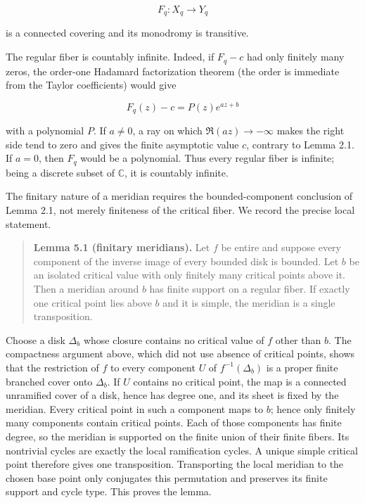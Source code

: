 \documentclass[11pt]{article}
\theoremstyle{keio}
\theoremstyle{definition}
\theoremstyle{remark}
\begin{document}
\[
 F_q:X_q\longrightarrow Y_q
\]

is a connected covering and its monodromy is transitive.

The regular fiber is countably infinite. Indeed, if \(F_q-c\) had only
finitely many zeros, the order-one Hadamard factorization theorem (the order
is immediate from the Taylor coefficients) would give

\[
 F_q(z)-c=P(z)e^{az+b}
\]

with a polynomial \(P\). If \(a\ne0\), a ray on which
\(\Re(az)\to-\infty\) makes the right side tend to zero and gives the finite
asymptotic value \(c\), contrary to Lemma 2.1. If \(a=0\), then \(F_q\)
would be a polynomial. Thus every regular fiber is infinite; being a
discrete subset of \(\mathbb C\), it is countably infinite.

The finitary nature of a meridian requires the bounded-component conclusion
of Lemma 2.1, not merely finiteness of the critical fiber. We record the
precise local statement.

\begin{quote}
\textbf{Lemma 5.1 (finitary meridians).} Let \(f\) be entire and suppose every
component of the inverse image of every bounded disk is bounded. Let
\(b\) be an isolated critical value with only finitely many critical
points above it. Then a meridian around \(b\) has finite support on a
regular fiber. If exactly one critical point lies above \(b\) and it is
simple, the meridian is a single transposition.
\end{quote}

Choose a disk \(\Delta_b\) whose closure contains no critical value of
\(f\) other than \(b\). The compactness argument above,
which did not use absence of critical points, shows that the restriction of
\(f\) to every component \(U\) of \(f^{-1}(\Delta_b)\) is a proper finite
branched cover onto \(\Delta_b\). If \(U\) contains no critical point, the
map is a connected unramified cover of a disk, hence has degree one, and its
sheet is fixed by the meridian. Every critical point in such a component
maps to \(b\); hence only finitely many components contain critical points.
Each of those components has finite degree, so the meridian is supported on
the finite union of their finite fibers. Its nontrivial cycles are exactly
the local ramification cycles. A unique simple critical point therefore
gives one transposition. Transporting the local meridian to the chosen base
point only conjugates this permutation and preserves its finite support and
cycle type. This proves the lemma.
\end{document}
